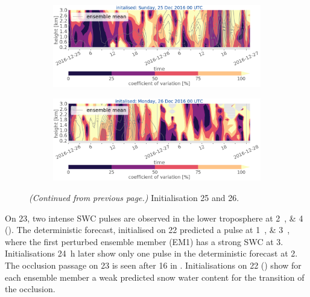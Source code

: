 \begin{figure}[t!]\ContinuedFloat
	\begin{subfigure}[b]{\textwidth}
		\includegraphics[trim={0cm 5cm 0cm 0cm},clip,width=\textwidth]{./fig_variation/20161225}
		\caption{}\label{fig:vari:EM25}
	\end{subfigure}
	\begin{subfigure}[b]{\textwidth}
		\includegraphics[trim={0cm 0cm 0cm 0cm},clip,width=\textwidth]{./fig_variation/20161226}
		\caption{}\label{fig:vari:EM26}
	\end{subfigure}
	\caption{\textit{(Continued from previous page.)} Initialisation \num{25} and \SI{26}{\dec}.}
\end{figure}
\noindent 
On \SI{23}{\dec}, two intense SWC pulses are observed in the lower troposphere at \SIlist{2;4}{\UTC} (). The deterministic forecast, initialised on \SI{22}{\dec} predicted a pulse at \SIlist{1;3}{\UTC}, where the first perturbed ensemble member (EM1) has a strong SWC at \SI{3}{\UTC}. Initialisations \SI{24}{\hour} later show only one pulse in the deterministic forecast at \SI{2}{\UTC}.
\\
The occlusion passage on \SI{23}{\dec} is seen after \SI{16}{\UTC} in .  
% 
Initialisations on \SI{22}{\dec} () show for each ensemble member a weak predicted snow water content for the transition of the occlusion. 

